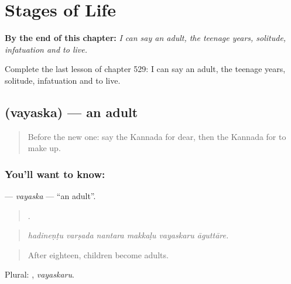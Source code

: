 
\chapter{Stages of Life}
\label{ch:ka-stages-of-life}

\begin{chapteropening}
\textbf{By the end of this chapter:} \emph{I can say an adult, the teenage years, solitude, infatuation and to live.}

Complete the last lesson of chapter 529: I can say an adult, the teenage years, solitude, infatuation and to live.
\end{chapteropening}

\section[\texorpdfstring{\kn{ವಯಸ್ಕ} (vayaska)}{ವಯಸ್ಕ (vayaska)}]{ (vayaska) — an adult}

\label{lesson:KA-C529-vayaska}



\begin{quote}
Before the new one: say the Kannada for dear, then the Kannada for to make up.
\end{quote}

\subsection*{You'll want to know: }
\textbf{} — \emph{vayaska} — \textquotedblleft{}an adult\textquotedblright{}.

\begin{quote}
     .
\end{quote}

\begin{quote}
\emph{hadineṇṭu varṣada nantara makkaḷu vayaskaru āguttāre.}
\end{quote}

\begin{quote}
After eighteen, children become adults.
\end{quote}

Plural: , \emph{vayaskaru}.

